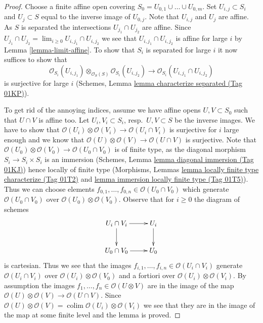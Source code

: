 \documentclass{amsart}
\theoremstyle{plain}
\theoremstyle{definition}
\theoremstyle{remark}
\numberwithin{equation}{subsection}
\def\lim{\mathop{\mathrm{lim}}\nolimits}
\def\colim{\mathop{\mathrm{colim}}\nolimits}
\begin{document}
\begin{proof}
Choose a finite affine open covering
$S_0 = U_{0, 1} \cup \ldots \cup U_{0, m}$.
Set $U_{i, j} \subset S_i$ and $U_j \subset S$
equal to the inverse image of $U_{0, j}$.
Note that $U_{i, j}$ and $U_j$ are affine. As $S$ is separated
the intersections $U_{j_1} \cap U_{j_2}$ are affine. Since
$U_{j_1} \cap U_{j_2} = \lim_{i \geq 0} U_{i, j_1} \cap U_{i, j_2}$
we see that $U_{i, j_1} \cap U_{i, j_2}$ is affine for large $i$
by Lemma \ref{lemma-limit-affine}. To show that $S_i$ is separated
for large $i$ it now suffices to show that
$$
\mathcal{O}_{S_i}(U_{i, j_1})
\otimes_{\mathcal{O}_S(S)}
\mathcal{O}_{S_i}(U_{i, j_2})
\longrightarrow
\mathcal{O}_{S_i}(U_{i, j_1} \cap U_{i, j_2})
$$
is surjective for large $i$
(Schemes, Lemma \href{https://stacks.math.columbia.edu/tag/01KP}{lemma characterize separated (Tag 01KP)}).

\medskip\noindent
To get rid of the annoying indices, assume we have affine opens
$U, V \subset S_0$ such that $U \cap V$ is affine too.
Let $U_i, V_i \subset S_i$, resp.\ $U, V \subset S$ be the inverse images.
We have to show that
$\mathcal{O}(U_i) \otimes \mathcal{O}(V_i) \to
\mathcal{O}(U_i \cap V_i)$
is surjective for $i$ large enough and we know that
$\mathcal{O}(U) \otimes \mathcal{O}(V) \to \mathcal{O}(U \cap V)$
is surjective. Note that
$\mathcal{O}(U_0) \otimes \mathcal{O}(V_0) \to
\mathcal{O}(U_0 \cap V_0)$
is of finite type, as the diagonal morphism $S_i \to S_i \times S_i$
is an immersion (Schemes, Lemma \href{https://stacks.math.columbia.edu/tag/01KJ}{lemma diagonal immersion (Tag 01KJ)})
hence locally of finite type
(Morphisms, Lemmas \href{https://stacks.math.columbia.edu/tag/01T2}{lemma locally finite type characterize (Tag 01T2)} and
\href{https://stacks.math.columbia.edu/tag/01T5}{lemma immersion locally finite type (Tag 01T5)}).
Thus we can choose elements
$f_{0, 1}, \ldots, f_{0, n} \in \mathcal{O}(U_0 \cap V_0)$
which generate $\mathcal{O}(U_0 \cap V_0)$ over
$\mathcal{O}(U_0) \otimes \mathcal{O}(V_0)$.
Observe that for $i \geq 0$ the diagram of schemes
$$
\xymatrix{
U_i \cap V_i \ar[r] \ar[d] & U_i \ar[d] \\
U_0 \cap V_0 \ar[r] & U_0
}
$$
is cartesian. Thus we see that the images
$f_{i, 1}, \ldots, f_{i, n} \in \mathcal{O}(U_i \cap V_i)$
generate $\mathcal{O}(U_i \cap V_i)$ over
$\mathcal{O}(U_i) \otimes \mathcal{O}(V_0)$
and a fortiori over
$\mathcal{O}(U_i) \otimes \mathcal{O}(V_i)$.
By assumption the images $f_1, \ldots, f_n \in \mathcal{O}(U \otimes V)$
are in the image of the map
$\mathcal{O}(U) \otimes \mathcal{O}(V) \to \mathcal{O}(U \cap V)$.
Since
$\mathcal{O}(U) \otimes \mathcal{O}(V) =
\colim \mathcal{O}(U_i) \otimes \mathcal{O}(V_i)$
we see that they are in the image of the map at some finite level
and the lemma is proved.
\end{proof}
\end{document}
